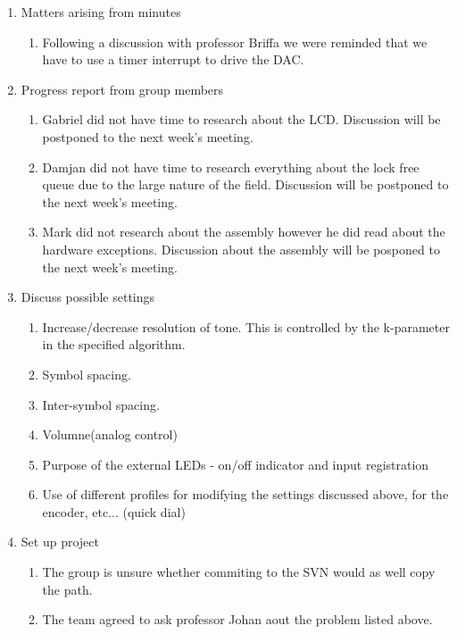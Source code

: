 \documentclass[11pt,a4paper]{scrartcl}
\begin{document}
\begin{enumerate}
\item Matters arising from minutes
\begin{enumerate}
   \item  Following a discussion with professor Briffa we were reminded that we have to use a timer interrupt to drive the DAC.
\end{enumerate}

\item Progress report from group members
   \begin{enumerate}
    \item Gabriel did not have time to research about the LCD. Discussion will be postponed to the next week's meeting.
    \item Damjan did not have time to research everything about the lock free queue due to the large nature of the field. Discussion will be postponed to the next week's meeting.
    \item Mark did not research about the assembly however he did read about the hardware exceptions. Discussion about the assembly will be posponed to the next week's meeting.
   \end{enumerate}

\item Discuss possible settings
    \begin{enumerate}
        \item Increase/decrease resolution of tone. This is controlled by the k-parameter in the specified algorithm.
        \item Symbol spacing.
        \item Inter-symbol spacing.
        \item Volumne(analog control)
        \item Purpose of the external LEDs - on/off indicator and input registration
        \item Use of different profiles for modifying the settings discussed above, for the encoder, etc... (quick dial)
    \end{enumerate}

\item Set up project
    \begin{enumerate}
        \item The group is unsure whether commiting to the SVN would as well copy the path.
        \item The team agreed to ask professor Johan aout the problem listed above.
    \end{enumerate}


\end{enumerate}
\end{document}
